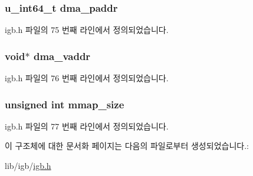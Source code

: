 \subsubsection[{\texorpdfstring{dma\+\_\+paddr}{dma_paddr}}]{\setlength{\rightskip}{0pt plus 5cm}u\+\_\+int64\+\_\+t dma\+\_\+paddr}\hypertarget{structigb__dma__alloc_a634628ebb0fecc5be46345b286cce0ef}{}\label{structigb__dma__alloc_a634628ebb0fecc5be46345b286cce0ef}


igb.\+h 파일의 75 번째 라인에서 정의되었습니다.

\subsubsection[{\texorpdfstring{dma\+\_\+vaddr}{dma_vaddr}}]{\setlength{\rightskip}{0pt plus 5cm}void$\ast$ dma\+\_\+vaddr}\hypertarget{structigb__dma__alloc_a1a7aec22103dc161f23a441da520af5b}{}\label{structigb__dma__alloc_a1a7aec22103dc161f23a441da520af5b}


igb.\+h 파일의 76 번째 라인에서 정의되었습니다.

\subsubsection[{\texorpdfstring{mmap\+\_\+size}{mmap_size}}]{\setlength{\rightskip}{0pt plus 5cm}unsigned int mmap\+\_\+size}\hypertarget{structigb__dma__alloc_a8258a70481ee5ece54c23de98e767611}{}\label{structigb__dma__alloc_a8258a70481ee5ece54c23de98e767611}


igb.\+h 파일의 77 번째 라인에서 정의되었습니다.



이 구조체에 대한 문서화 페이지는 다음의 파일로부터 생성되었습니다.\+:\begin{DoxyCompactItemize}
\item 
lib/igb/\hyperlink{lib_2igb_2igb_8h}{igb.\+h}\end{DoxyCompactItemize}
